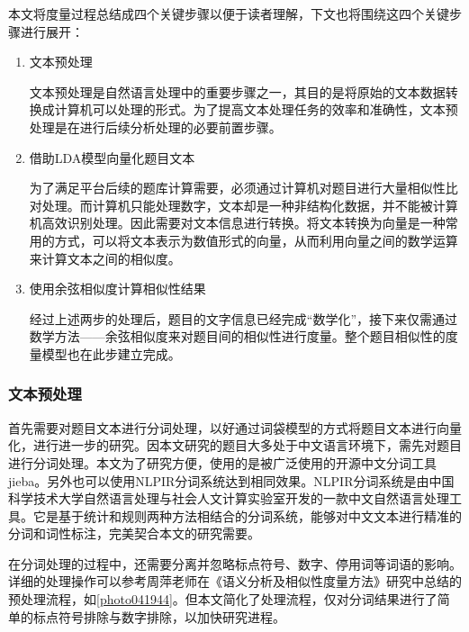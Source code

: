 本文将度量过程总结成四个关键步骤以便于读者理解，下文也将围绕这四个关键步骤进行展开：

\begin{enumerate}
    \item 文本预处理
    
    文本预处理是自然语言处理中的重要步骤之一，其目的是将原始的文本数据转换成计算机可以处理的形式。为了提高文本处理任务的效率和准确性，文本预处理是在进行后续分析处理的必要前置步骤。

    \item 借助LDA模型向量化题目文本
    
    为了满足平台后续的题库计算需要，必须通过计算机对题目进行大量相似性比对处理。而计算机只能处理数字，文本却是一种非结构化数据，并不能被计算机高效识别处理。因此需要对文本信息进行转换。将文本转换为向量是一种常用的方式，可以将文本表示为数值形式的向量，从而利用向量之间的数学运算来计算文本之间的相似度。

    \item 使用余弦相似度计算相似性结果
    
    经过上述两步的处理后，题目的文字信息已经完成“数学化”，接下来仅需通过数学方法——余弦相似度来对题目间的相似性进行度量。整个题目相似性的度量模型也在此步建立完成。
\end{enumerate}

\subsubsection{文本预处理}

首先需要对题目文本进行分词处理，以好通过词袋模型的方式将题目文本进行向量化，进行进一步的研究。因本文研究的题目大多处于中文语言环境下，需先对题目进行分词处理。本文为了研究方便，使用的是被广泛使用的开源中文分词工具jieba。另外也可以使用NLPIR分词系统达到相同效果。NLPIR分词系统是由中国科学技术大学自然语言处理与社会人文计算实验室开发的一款中文自然语言处理工具。它是基于统计和规则两种方法相结合的分词系统，能够对中文文本进行精准的分词和词性标注，完美契合本文的研究需要。

在分词处理的过程中，还需要分离并忽略标点符号、数字、停用词等词语的影响。详细的处理操作可以参考周萍老师在《语义分析及相似性度量方法》\cite{ZhouJiYuYuYiFenXiDeWenBenXiangSiXingDuLiangYanJiuJiYingYong2017}研究中总结的预处理流程，如\ref{photo041944}。但本文简化了处理流程，仅对分词结果进行了简单的标点符号排除与数字排除，以加快研究进程。

